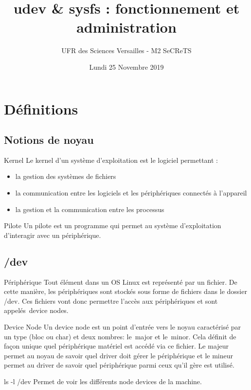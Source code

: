 \documentclass{beamer}
\title{udev \& sysfs : fonctionnement et administration}
\author{UFR des Sciences Versailles - M2 SeCReTS}
\institute{CAUMES Clément \& DEBROUASSE Kevin \& \\ HEQUET Jonathan \& Mehdi MTALSI-MERIMI}
\date{Lundi 25 Novembre 2019}
\begin{document}
  \begin{frame}
  \titlepage
  \end{frame}

\section{Définitions}

\subsection{Notions de noyau}

 \begin{frame}
	\begin{block}{Kernel} 
	Le kernel d'un système d'exploitation est le logiciel permettant : 
	\begin{itemize}
		[circle]
		\item la gestion des systèmes de fichiers
		\item la communication entre les logiciels et les périphériques connectés à l'appareil
		\item la gestion et la communication entre les processus
	\end{itemize}
	\end{block}

	\begin{block}{Pilote} 
		Un pilote est un programme qui permet au système d'exploitation d'interagir avec un périphérique.
	\end{block}


\end{frame}

\subsection{/dev}
 \begin{frame}
	\begin{block}{Périphérique} 
		Tout élément dans un OS Linux est représenté par un fichier. De cette manière, les périphériques sont stockés sous forme de fichiers dans le dossier /dev.
		Ces fichiers vont donc permettre l’accès aux périphériques et sont appelés device nodes. 
	\end{block}
\end{frame}
\begin{frame}
    \begin{block}{Device Node}
    	Un device node est un point d’entrée vers le noyau caractérisé par un type (bloc ou char) et deux nombres: le major et le minor. Cela définit de façon unique quel périphérique matériel est accédé via ce fichier. Le majeur permet au noyau de savoir quel driver doit gérer le périphérique et le mineur permet au driver de savoir quel périphérique parmi ceux qu’il gère est utilisé. 
    \end{block}
	\begin{exampleblock}{ls -l /dev} 
		 Permet de voir les différents node devices de la machine.
	\end{exampleblock}
\end{frame}
\end{document}
